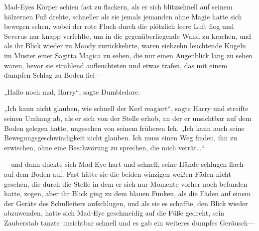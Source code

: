 Mad-Eyes Körper schien fast zu flackern, als er sich blitzschnell auf seinem hölzernen Fuß drehte, schneller als sie jemals jemanden ohne Magie hatte sich bewegen sehen, wobei der rote Fluch durch die plötzlich leere Luft flog und Severus nur knapp verfehlte, um in die gegenüberliegende Wand zu krachen, und als ihr Blick wieder zu Moody zurückkehrte, waren siebzehn leuchtende Kugeln im Muster einer Sagitta Magica zu sehen, die nur einen Augenblick lang zu sehen waren, bevor sie strahlend aufleuchteten und etwas trafen, das mit einem dumpfen Schlag zu Boden fiel—

\later

„Hallo noch mal, Harry“, sagte Dumbledore.

„Ich kann nicht glauben, wie schnell der Kerl reagiert“, sagte Harry und streifte seinen Umhang ab, als er sich von der Stelle erhob, an der er unsichtbar auf dem Boden gelegen hatte, ungesehen von seinem früheren Ich. „Ich kann auch seine Bewegungsgeschwindigkeit nicht glauben. Ich muss einen Weg finden, ihn zu erwischen, ohne eine Beschwörung zu sprechen, die mich verrät…“

\later

—und dann duckte sich Mad-Eye hart und schnell, seine Hände schlugen flach auf dem Boden auf. Fast hätte sie die beiden winzigen weißen Fäden nicht gesehen, die durch die Stelle in dem er sich nur Momente vorher noch befunden hatte, zogen, aber ihr Blick ging zu dem blauen Funken, als die Fäden auf einem der Geräte des Schulleiters aufschlugen, und als sie es schaffte, den Blick wieder abzuwenden, hatte sich Mad-Eye geschmeidig auf die Füße gedreht, sein Zauberstab tanzte unsichtbar schnell und es gab ein weiteres dumpfes Geräusch—

